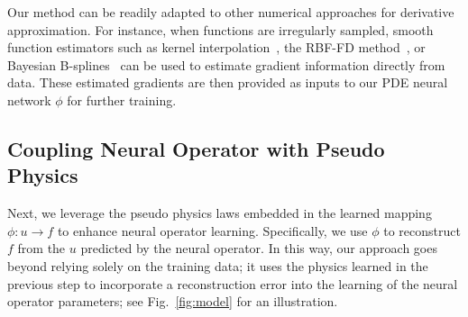 Our method can be readily adapted to other numerical approaches for derivative approximation. For instance, when functions are irregularly sampled, smooth function estimators such as kernel interpolation~\citep{long2024equation}, the RBF-FD method~\citep{fornberg2013stable,fornberg2015solving}, or Bayesian B-splines~\citep{sun2022bayesian} can be used to estimate gradient information directly from data. These estimated gradients are then provided as inputs to our PDE neural network $\phi$ for further training.










\subsection{Coupling Neural Operator with Pseudo Physics}
Next, we leverage the pseudo physics laws embedded in the learned mapping \(\phi: u \rightarrow f\) to enhance neural operator learning. Specifically, we use \(\phi\) to reconstruct \(f\) from the \(u\) predicted by the neural operator. %
In this way, our approach goes beyond relying solely on the training data; it uses the physics learned in the previous step to incorporate a reconstruction error into the learning  of the neural operator parameters; see Fig.~\ref{fig:model} for an illustration. 
 
